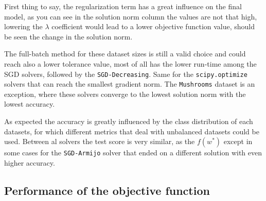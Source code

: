 


First thing to say, the regularization term has a great influence on the final model, as you can see in the solution norm column the values are not that high, %
lowering the $\lambda$ coefficient would lead to a lower objective function value, should be seen the change in the solution norm.


The full-batch method for these dataset sizes is still a valid choice and could reach also a lower tolerance value, most of all has the lower run-time among the SGD solvers, followed by the \texttt{SGD-Decreasing}. Same for the \texttt{scipy.optimize} solvers that can reach the smallest gradient norm. The \texttt{Mushrooms} dataset is an exception, where these solvers converge to the lowest solution norm with the lowest accuracy.

As expected the accuracy is greatly influenced by the class distribution of each datasets, for which different metrics that deal with unbalanced datasets could be used. Between al solvers the test score is very similar, as the $f(w^\ast)$ except in some cases for the \texttt{SGD-Armijo} solver that ended on a different solution with even higher accuracy.

\subsection{Performance of the objective function}

